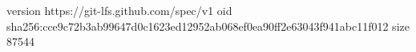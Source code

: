 version https://git-lfs.github.com/spec/v1
oid sha256:cce9c72b3ab99647d0c1623ed12952ab068ef0ea90ff2e63043f941abc11f012
size 87544

